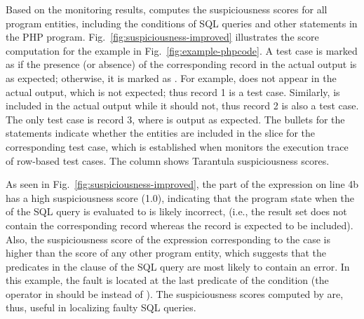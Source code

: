 Based on the monitoring results, \tool{} computes the suspiciousness
scores for all program entities, including the 
conditions of SQL queries and other statements in the PHP
program. Fig.~\ref{fig:suspiciousness-improved} illustrates the
score computation for the example in
Fig.~\ref{fig:example-phpcode}. A test case is marked as
 if the presence (or absence) of the
corresponding record in the actual output is as expected; otherwise,
it is marked as . For example,  does not
appear in the actual output, which is not expected; thus record 1 is a
 test case. Similarly,  is included in the
actual output while it should not, thus record 2 is also a
 test case. The only  test case is record 3,
where  is output as expected. The bullets for the 
statements indicate whether the entities are included in the slice for
the corresponding test case, which is established when \tool{}
monitors the execution trace of row-based test cases. 
The column  shows Tarantula suspiciousness scores. 



As seen in Fig.~\ref{fig:suspiciousness-improved}, the 
part of the  expression on line 4b has a high
suspiciousness score (1.0), indicating that the program state when the
 of the SQL query is evaluated to  is likely
incorrect, (i.e., the result set does not contain the corresponding
record whereas the record is expected to be included). Also, the
suspiciousness score of the
 expression corresponding to the  case is
higher than the score of any other program entity, which suggests that
the predicates in the  clause of the SQL query are most
likely to contain an error. In this example, the fault is located at
the last predicate of the  condition (the operator in
 should be
 instead of ). 
The suspiciousness scores computed by \tool{} are, thus, useful in
localizing faulty SQL queries.  

